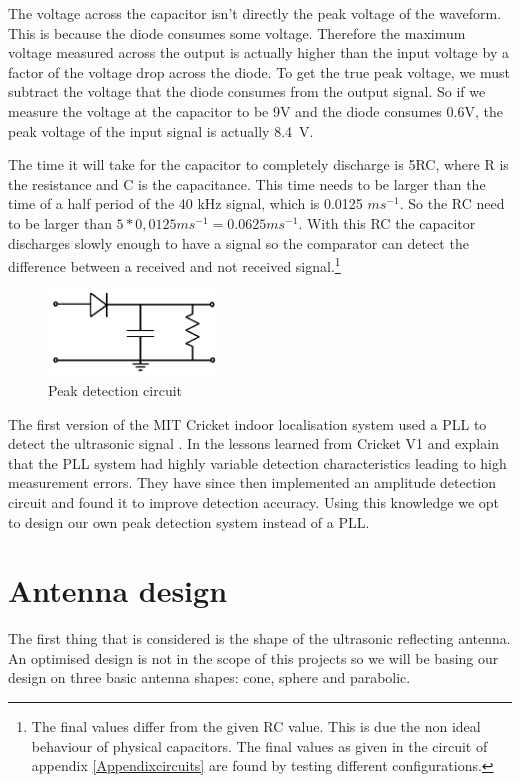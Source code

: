 The voltage across the capacitor isn't directly the peak voltage of the waveform.
This is because the diode consumes some voltage.
Therefore the maximum voltage measured across the output is actually higher than the input voltage by a factor of the voltage drop across the diode.
To get the true peak voltage, we must subtract the voltage that the diode consumes from the output signal.
So if we measure the voltage at the capacitor to be 9V and the diode consumes 0.6V, the peak voltage of the input signal is actually \SI{8.4}{\volt}.

The time it will take for the capacitor to completely discharge is 5RC, where R is the resistance and C is the capacitance.
This time needs to be larger than the time of a half period of the 40 kHz signal, which is 0.0125 $ms^{-1}$.
So the RC need to be larger than $5 * 0,0125 ms^{-1} = 0.0625ms^{-1}$.
With this RC the capacitor discharges slowly enough to have a signal so the comparator can detect the difference between a received and not received signal.\footnote{The final values differ from the given RC value. This is due the non ideal behaviour of physical capacitors. The final values as given in the circuit of appendix \ref{Appendixcircuits} are found by testing different configurations.}

\begin{figure}[H]
\centering
\includegraphics[width=0.4\textwidth]{Figures/peak_d.PNG}
\caption{Peak detection circuit}
\label{fig:peak_d}
\end{figure}

The first version of the MIT Cricket indoor localisation system used a PLL to detect the ultrasonic signal \cite{Priyantha2000}.
In \cite{Balakrishnan2003} the lessons learned from Cricket V1 and explain that the PLL system had highly variable detection characteristics leading to high measurement errors.
They have since then implemented an amplitude detection circuit and found it to improve detection accuracy.
Using this knowledge we opt to design our own peak detection system instead of a PLL.

\section{Antenna design}
The first thing that is considered is the shape of the ultrasonic reflecting antenna. An optimised design is not in the scope of this projects so we will be basing our design on three basic antenna shapes: cone, sphere and parabolic.

